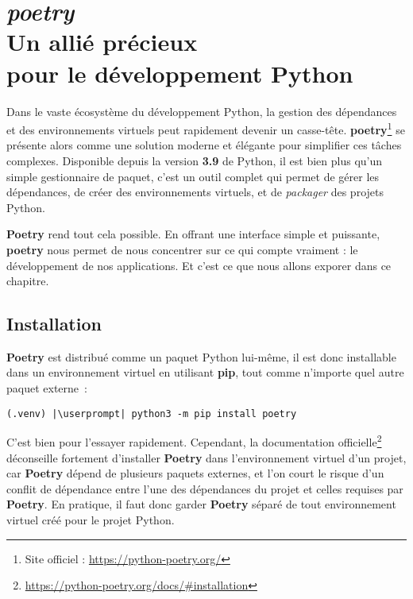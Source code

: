 \chapter[\textit{poetry}]{\textit{poetry} \\ Un allié précieux \\ pour le développement Python}

\bigskip

Dans le vaste écosystème du développement Python, la gestion des dépendances et des environnements virtuels peut rapidement devenir un casse-tête. \textbf{poetry}\footnote{Site officiel : \url{https://python-poetry.org/}} se présente alors comme une solution moderne et élégante pour simplifier ces tâches complexes. Disponible depuis la version \textbf{3.9} de Python, il est bien plus qu'un simple gestionnaire de paquet, c'est un outil complet qui permet de gérer les dépendances, de créer des environnements virtuels, et de \textit{packager} des projets Python.

\textbf{Poetry} rend tout cela possible. En offrant une interface simple et puissante, \textbf{poetry} nous permet de nous concentrer sur ce qui compte vraiment : le développement de nos applications. Et c'est ce que nous allons exporer dans ce chapitre.

\section{Installation}
\textbf{Poetry} est distribué comme un paquet Python lui-même, il est donc installable dans un environnement virtuel en utilisant \textbf{pip}, tout comme n’importe quel autre paquet externe :
\begin{lstlisting}[style=bash]
(.venv) |\userprompt| python3 -m pip install poetry
\end{lstlisting}

C’est bien pour l’essayer rapidement. Cependant, la documentation officielle\footnote{\url{https://python-poetry.org/docs/\#installation}} déconseille fortement d’installer \textbf{Poetry} dans l'environnement virtuel d'un projet, car \textbf{Poetry} dépend de plusieurs paquets externes, et l'on court le risque d’un conflit de dépendance entre l’une des dépendances du projet et celles requises par \textbf{Poetry}. En pratique, il faut donc garder \textbf{Poetry} séparé de tout environnement virtuel créé pour le projet Python. 

